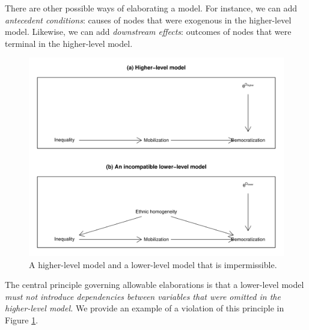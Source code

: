 \documentclass[
  12pt,
]{book}
\begin{document}
There are other possible ways of elaborating a model. For instance, we can add \emph{antecedent conditions}: causes of nodes that were exogenous in the higher-level model. Likewise, we can add \emph{downstream effects}: outcomes of nodes that were terminal in the higher-level model.

\begin{figure}

{\centering \includegraphics[width=.7\textwidth]{ii_files/figure-latex/incompat-1} 

}

\caption{A higher-level model and a lower-level model that is impermissible.}\label{fig:incompat}
\end{figure}

The central principle governing allowable elaborations is that a lower-level model \emph{must not introduce dependencies between variables that were omitted in the higher-level model.} We provide an example of a violation of this principle in Figure \ref{fig:incompat}.
\end{document}
